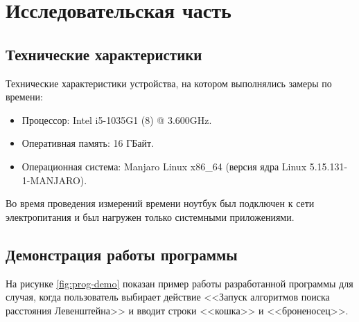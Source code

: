\chapter{Исследовательская часть}

\section{Технические характеристики}

Технические характеристики устройства, на котором выполнялись замеры по времени:

\begin{itemize}
    \item Процессор: Intel i5-1035G1 (8) @ 3.600GHz.
    \item Оперативная память: 16 ГБайт.
    \item Операционная система: Manjaro Linux x86\_64 (версия ядра Linux 5.15.131-1-MANJARO).
\end{itemize}

Во время проведения измерений времени ноутбук был подключен к сети электропитания и был нагружен только системными приложениями.

\section{Демонстрация работы программы}

На рисунке \ref{fig:prog-demo} показан пример работы разработанной программы для случая, когда пользователь выбирает действие <<Запуск алгоритмов поиска расстояния Левенштейна>> и вводит строки <<кошка>> и <<броненосец>>.


